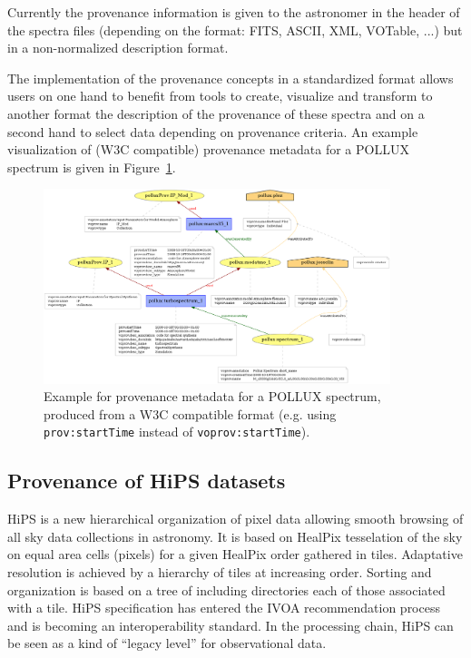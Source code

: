 Currently the provenance information is given to the astronomer in the header of the spectra files (depending on the format: FITS, ASCII, XML, VOTable, ...) but in a non-normalized description format. 

The implementation of the provenance concepts in a standardized format allows users on one hand to benefit from tools to create, visualize and transform to another format the description of the provenance of these spectra and on a second hand to select data depending on provenance criteria. An example visualization of (W3C compatible) provenance metadata for a POLLUX spectrum is given in Figure~\ref{fig:pollux}.

\begin{figure}
\centering
\includegraphics[width=0.9\textwidth]{usecase_Pollux_example1.png}
\caption{Example for provenance metadata for a POLLUX spectrum, produced from a W3C compatible format (e.g. using \texttt{prov:startTime} instead of \texttt{voprov:startTime}).}
\label{fig:pollux}
\end{figure}

\subsection{Provenance of HiPS datasets}
HiPS \cite{std:HiPs} is a new hierarchical organization of pixel data allowing smooth browsing of all sky data collections in astronomy. It is based on HealPix tesselation of the sky on equal area cells (pixels) for a given HealPix order gathered in tiles. Adaptative resolution is achieved by a hierarchy of tiles at increasing order. Sorting and organization is based on a tree of including directories each of those associated with a tile. HiPS specification has entered the IVOA recommendation process and is becoming an interoperability standard.
In the processing chain, HiPS can be seen as a kind of ``legacy level'' for observational data.


